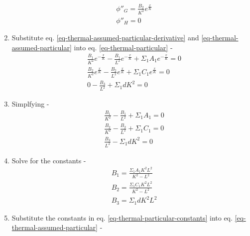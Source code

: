 \documentclass[11pt,a4paper]{article}
\begin{document}
\begin{enumerate}[leftmargin=*,topsep=0pt]
\begin{equation}
\begin{split}
                & \phi''_G=\frac{B_2}{K^2}e^{\frac{x}{K}} \\
                & \phi''_H=0
            \end{split}
        \end{equation}
    \item Substitute eq. \ref{eq-thermal-assumed-particular-derivative} and \ref{eq-thermal-assumed-particular} into eq. \ref{eq-thermal-particular} - 
        \begin{equation}
            \begin{split}
                & \frac{B_1}{K^2}e^{-\frac{x}{K}}-\frac{B_1}{L^2}e^{-\frac{x}{K}}+\Sigma_1 A_1 e^{-\frac{x}{K}}=0 \\
                & \frac{B_2}{K^2}e^{\frac{x}{K}}-\frac{B_2}{L^2}e^{\frac{x}{K}}+\Sigma_1 C_1 e^{\frac{x}{K}}=0 \\
                & 0-\frac{B_3}{L^2}+\Sigma_1 dK^2=0
            \end{split}
        \end{equation}
    \item Simplfying - 
        \begin{equation}
            \begin{split}
                & \frac{B_1}{K^2}-\frac{B_1}{L^2}+\Sigma_1 A_1 =0 \\
                & \frac{B_2}{K^2}-\frac{B_2}{L^2}+\Sigma_1 C_1 =0 \\
                & \frac{B_3}{L^2}-\Sigma_1 dK^2 = 0
            \end{split}
        \end{equation}
    \item Solve for the constants - 
        \begin{equation} \label{eq-thermal-particular-constants}
            \begin{split}
                & B_1=\frac{\Sigma_1 A_1 K^2 L^2}{K^2-L^2} \\
                & B_2=\frac{\Sigma_1 C_1 K^2 L^2}{K^2-L^2} \\
                & B_3=\Sigma_1dK^2L^2
            \end{split}
        \end{equation}
    \item Substitute the constants in eq. \ref{eq-thermal-particular-constants} into eq. \ref{eq-thermal-assumed-particular} - 
        \begin{equation} \label{eq-thermal-particular-solution}
            \begin{split}

\end{split}
\end{equation}
\end{enumerate}
\end{document}
